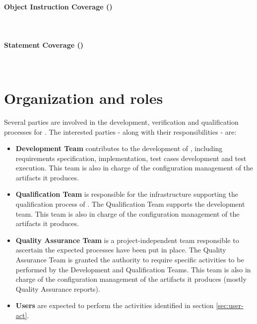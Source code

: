 \paragraph*{Object Instruction Coverage (\oic)} \ \\

\paragraph*{Statement Coverage (\stc)} \ \\

\section{Organization and roles}
Several parties are involved in the development, verification and qualification processes for \xcov. The interested parties - along with their responsibilities - are:
\begin{itemize}
\item \textbf{\xcov Development Team} contributes to the development of \xcov, including requirements specification, implementation, test cases development and test execution. This team is also in charge of the configuration management of the artifacts it produces.
\item \textbf{\xcov Qualification Team} is responsible for the infrastructure
supporting the qualification process of \xcov. The Qualification Team supports the development team. This team is also in charge of the configuration management of the artifacts it produces.
\item \textbf{\xcov Quality Assurance Team} is a project-independent team responsible to ascertain the expected processes have been put in place. The Quality Assurance Team is granted the authority to require specific activities to be performed by the \xcov Development and Qualification Teams. This team is also in charge of the configuration management of the artifacts it produces (mostly Quality Assurance reports).
\item \textbf{\xcov Users} are expected to perform the activities identified in
section \ref{sec:user-act}.
\end{itemize}

